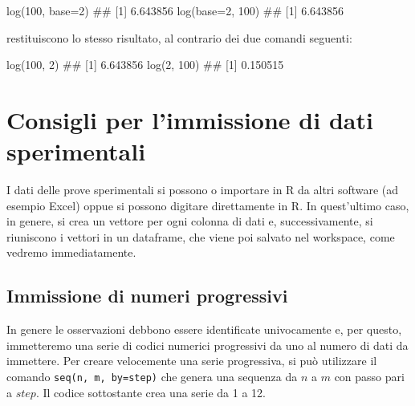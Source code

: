 \documentclass[a4paper,12pt,oneside]{book}
\newenvironment{Shaded}{\begin{snugshade}}{\end{snugshade}}
\newcommand{\DecValTok}[1]{#1}
\newcommand{\DocumentationTok}[1]{#1}
\newcommand{\FunctionTok}[1]{#1}
\newcommand{\AttributeTok}[1]{#1}
\newcommand{\NormalTok}[1]{#1}
\begin{document}
\begin{Shaded}
\begin{Highlighting}[]
\FunctionTok{log}\NormalTok{(}\DecValTok{100}\NormalTok{, }\AttributeTok{base=}\DecValTok{2}\NormalTok{)}
\DocumentationTok{\#\# [1] 6.643856}
\FunctionTok{log}\NormalTok{(}\AttributeTok{base=}\DecValTok{2}\NormalTok{, }\DecValTok{100}\NormalTok{)}
\DocumentationTok{\#\# [1] 6.643856}
\end{Highlighting}
\end{Shaded}

restituiscono lo stesso risultato, al contrario dei due comandi seguenti:

\begin{Shaded}
\begin{Highlighting}[]
\FunctionTok{log}\NormalTok{(}\DecValTok{100}\NormalTok{, }\DecValTok{2}\NormalTok{)}
\DocumentationTok{\#\# [1] 6.643856}
\FunctionTok{log}\NormalTok{(}\DecValTok{2}\NormalTok{, }\DecValTok{100}\NormalTok{)}
\DocumentationTok{\#\# [1] 0.150515}
\end{Highlighting}
\end{Shaded}

\hypertarget{consigli-per-limmissione-di-dati-sperimentali}{%
\section*{Consigli per l'immissione di dati sperimentali}\label{consigli-per-limmissione-di-dati-sperimentali}}

I dati delle prove sperimentali si possono o importare in R da altri software (ad esempio Excel) oppue si possono digitare direttamente in R. In quest'ultimo caso, in genere, si crea un vettore per ogni colonna di dati e, successivamente, si riuniscono i vettori in un dataframe, che viene poi salvato nel workspace, come vedremo immediatamente.

\hypertarget{immissione-di-numeri-progressivi}{%
\subsection*{Immissione di numeri progressivi}\label{immissione-di-numeri-progressivi}}

In genere le osservazioni debbono essere identificate univocamente e, per questo, immetteremo una serie di codici numerici progressivi da uno al numero di dati da immettere. Per creare velocemente una serie progressiva, si può utilizzare il comando \texttt{seq(n,\ m,\ by=step)} che genera una sequenza da \(n\) a \(m\) con passo pari a \(step\). Il codice sottostante crea una serie da 1 a 12.
\end{document}
